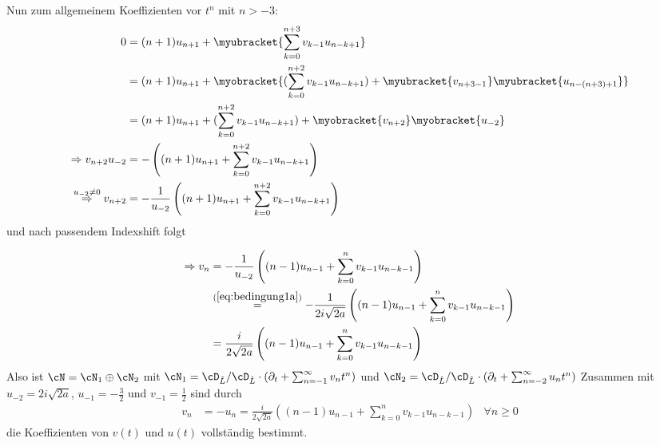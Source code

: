 Nun zum allgemeinem Koeffizienten vor $t^{n}$ mit $n>-3$:
\begin{align*}
0&= (n+1)u_{n+1} + \myubracket{\sum_{k=0}^{n+3} v_{k-1}u_{n-k+1}}
\\&= (n+1)u_{n+1} + \myobracket{(\sum_{k=0}^{n+2} v_{k-1}u_{n-k+1})
  + \myubracket{v_{n+3-1\phantom{\!\!)}}}\myubracket{u_{n-(n+3)+1}}}
\\&= (n+1)u_{n+1} + (\sum_{k=0}^{n+2} v_{k-1}u_{n-k+1})
  + \myobracket{v_{n+2}}\myobracket{u_{-2}}
\\\Rightarrow v_{n+2}u_{-2}&=-\left((n+1)u_{n+1} + \sum_{k=0}^{n+2}
  v_{k-1}u_{n-k+1}\right)
\\\overset{u_{-2}\neq 0}{\Rightarrow} v_{n+2} &= - \frac{1}{u_{-2}}
  \left((n+1)u_{n+1} + \sum_{k=0}^{n+2} v_{k-1}u_{n-k+1}\right)
\end{align*}
und nach passendem Indexshift folgt
\begin{comment} $n+2\rightarrow n$  \end{comment}
\begin{align*}
\Rightarrow v_{n} &= - \frac{1}{u_{-2}}
  \left((n-1)u_{n-1} + \sum_{k=0}^{n} v_{k-1}u_{n-k-1}\right)
\\&\overset{(\ref{eq:bedingung1a})}{=} - \frac{1}{2i\sqrt{2a}}
  \left((n-1)u_{n-1} + \sum_{k=0}^{n} v_{k-1}u_{n-k-1}\right)
\\&= \frac{i}{2\sqrt{2a}}
  \left((n-1)u_{n-1} + \sum_{k=0}^{n} v_{k-1}u_{n-k-1}\right)
\end{align*}
Also ist $\cN=\cN_1\oplus\cN_2$ mit 
$\cN_1=\cD_{\hat L}/\cD_{\hat L}\cdot (\partial_t + \sum_{n=-1}^\infty v_nt^n)$
und
$\cN_2=\cD_{\hat L}/\cD_{\hat L}\cdot (\partial_t + \sum_{n=-2}^\infty u_nt^n)$
Zusammen mit $u_{-2}=2i\sqrt{2a}$, $u_{-1}=-\frac{3}{2}$ und
$v_{-1}=\frac{1}{2}$ sind durch
\begin{align} \label{eq:induktiveFormel}
v_n &= - u_n = \frac{i}{2\sqrt{2a}}
  \left((n-1)u_{n-1} + \sum_{k=0}^{n} v_{k-1}u_{n-k-1}\right) & \forall n \geq 0
\end{align}
die Koeffizienten von $v(t)$ und $u(t)$ vollständig bestimmt.

